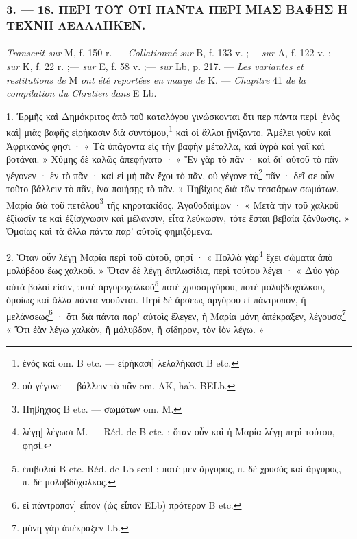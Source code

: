 \documentclass[landscape, a4paper, 11pt, oneside, polutonikogreek, french]{article}
\begin{document}
\subsubsection{3. --- 18. ΠΕΡΙ ΤΟΥ ΟΤΙ ΠΑΝΤΑ ΠΕΡΙ ΜΙΑΣ ΒΑΦΗΣ Η ΤΕΧΝΗ ΛΕΛΑΛΗΚΕΝ.}
\paragraph{}
\emph{Transcrit sur} M, f. 150 r. --- \emph{Collationné sur} B, f. 133 v. ;--- \emph{sur} A, f. 122 v. ;--- \emph{sur} K, f. 22 r. ;--- \emph{sur} E, f. 58 v. ;--- \emph{sur} Lb, p. 217. --- \emph{Les variantes et restitutions de} M \emph{ont été reportées en marge de} K. --- \emph{Chapitre} 41 \emph{de la compilation du Chretien dans} E Lb.

\bigskip

1. Ἑρμῆς καὶ Δημόκριτος ἀπὸ τοῦ καταλόγου γινώσκονται ὅτι περ πάντα περὶ [ἑνὸς καὶ] μιᾶς βαφῆς εἰρήκασιν διὰ συντόμου,\footnote{ἑνὸς καὶ om. B etc. --- εἰρήκασι] λελαλήκασι B etc.} καὶ οἱ ἄλλοι ῇνίξαντο. Ἀμέλει γοῦν καὶ Ἀφρικανός φησι · « Τὰ ὑπάγοντα εἰς τὴν βαφὴν μέταλλα, καὶ ὑγρὰ καὶ γαῖ καὶ βοτάναι. » Χύμης δὲ καλῶς ἀπεφήνατο · « Ἓν γὰρ τὸ πᾶν · καὶ δι' αὐτοῦ τὸ πᾶν γέγονεν · ἓν τὸ πᾶν · καὶ εἰ μὴ πᾶν ἔχοι τὸ πᾶν, οὐ γέγονε τὸ\footnote{οὐ γέγονε --- βάλλειν τὸ πᾶν om. AK, hab. BELb.} πᾶν · δεῖ σε οὖν τοῦτο βάλλειν τὸ πᾶν, ἵνα ποιήσῃς τὸ πᾶν. » Πηβίχιος διὰ τῶν τεσσάρων σωμάτων. Μαρία διὰ τοῦ πετάλου\footnote{Πηβήχιος B etc. --- σωμάτων om. M.} τῆς κηροτακίδος. Ἀγαθοδαίμων · « Μετὰ τὴν τοῦ χαλκοῦ ἐξίωσίν τε καὶ ἐξίσχνωσιν καὶ μέλανσιν, εἶτα λεύκωσιν, τότε ἔσται βεβαία ξάνθωσις. » Ὁμοίως καὶ τὰ ἄλλα πάντα παρ' αὐτοῖς φημιζόμενα.

2. Ὅταν οὖν λέγῃ Μαρία περὶ τοῦ αὐτοῦ, φησί · « Πολλὰ γὰρ\footnote{λέγῃ] λέγωσι M. --- Réd. de B etc. : ὅταν οὖν καὶ ἡ Μαρία λέγῃ περὶ τούτου, φησί.} ἔχει σώματα ἀπὸ μολύβδου ἕως χαλκοῦ. » Ὅταν δὲ λέγῃ διπλωσίδια, περὶ τούτου λέγει · « Δύο γὰρ αὐτὰ βολαί εἰσιν, ποτὲ ἀργυροχαλκοῦ\footnote{ἐπιβολαὶ B etc. Réd. de Lb seul : ποτὲ μὲν ἄργυρος, π. δὲ χρυσὸς καὶ ἄργυρος, π. δὲ μολυβδόχαλκος.} ποτὲ χρυσαργύρου, ποτὲ μολυβδοχάλκου, ὁμοίως καὶ ἄλλα πάντα νοοῦνται. Περὶ δὲ ἄρσεως ἀργύρου εἰ πάντροπον, ἤ μελάνσεως\footnote{εἰ πάντροπον] εἶπον (ὡς εἶπον ELb) πρότερον B etc.} · ὅτι διὰ πάντα παρ' αὐτοῖς ἔλεγεν, ἡ Μαρία μόνη ἀπέκραξεν, λέγουσα\footnote{μόνη γὰρ ἀπέκραξεν Lb.} « Ὅτι ἐὰν λέγω χαλκὸν, ἢ μόλυβδον, ἢ σίδηρον, τὸν ἰὸν λέγω. »

\bigskip
\centerline{\EightStarTaper}
\centerline{\EightStarTaper\EightStarTaper}
\bigskip
\end{document}
